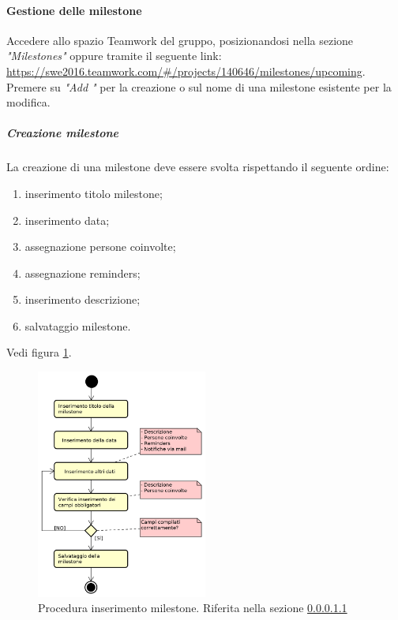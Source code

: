            \paragraph{Gestione delle milestone}
            Accedere allo spazio Teamwork del gruppo, posizionandosi nella sezione \textit{"Milestones"} oppure tramite il seguente link: \url{https://swe2016.teamwork.com/#/projects/140646/milestones/upcoming}. Premere su \textit{"Add "} per la creazione o sul nome di una milestone esistente per la modifica.
            \subparagraph{Creazione milestone}\label{sec:creazionemilestone}
                La creazione di una milestone deve essere svolta rispettando il seguente ordine:
    			\begin{enumerate}
    				\item inserimento titolo milestone;
    				\item inserimento data;
    				\item assegnazione persone coinvolte;
    				\item assegnazione reminders;
    				\item inserimento descrizione;
    				\item salvataggio milestone.
    			\end{enumerate}
                Vedi figura \ref{fig:procinsmilestone}.
    			\begin{figure}[h!]
                    \centering
    				\includegraphics[width=0.5\textwidth]{img/proc_ins_milestone}
    				\caption{Procedura inserimento milestone. Riferita nella sezione \ref{sec:creazionemilestone}}
                    \label{fig:procinsmilestone}
    			\end{figure}\mbox{}\\
